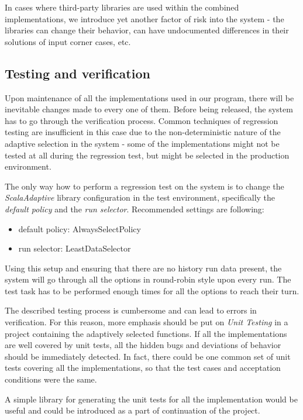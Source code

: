 In cases where third-party libraries are used within the combined implementations, we introduce yet another factor of risk into the system - the libraries can change their behavior, can have undocumented differences in their solutions of input corner cases, etc.

\subsection{Testing and verification}

Upon maintenance of all the implementations used in our program, there will be inevitable changes made to every one of them. Before being released, the system has to go through the verification process. Common techniques of regression testing are insufficient in this case due to the non-deterministic nature of the adaptive selection in the system - some of the implementations might not be tested at all during the regression test, but might be selected in the production environment.

The only way how to perform a regression test on the system is to change the \textit{ScalaAdaptive} library configuration in the test environment, specifically the \textit{default policy} and the \textit{run selector}. Recommended settings are following:

 \begin{itemize}
 	\item default policy: AlwaysSelectPolicy
 	\item run selector: LeastDataSelector
 \end{itemize}

Using this setup and ensuring that there are no history run data present, the system will go through all the options in round-robin style upon every run. The test task has to be performed enough times for all the options to reach their turn.

The described testing process is cumbersome and can lead to errors in verification. For this reason, more emphasis should be put on \textit{Unit Testing} in a project containing the adaptively selected functions. If all the implementations are well covered by unit tests, all the hidden bugs and deviations of behavior should be immediately detected. In fact, there could be one common set of unit tests covering all the implementations, so that the test cases and acceptation conditions were the same.

A simple library for generating the unit tests for all the implementation would be useful and could be introduced as a part of continuation of the project.

